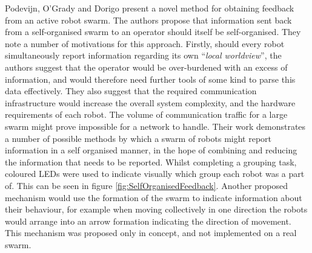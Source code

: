 Podevijn, O'Grady and Dorigo \cite{Podevijn:2012} present a novel method for obtaining feedback from an active robot swarm. The authors propose that information sent back from a self-organised swarm to an operator should itself be self-organised. They note a number of motivations for this approach. Firstly, should every robot simultaneously report information regarding its own ``\textit{local worldview}'', the authors suggest \cite{Podevijn:2012} that the operator would be over-burdened with an excess of information, and would therefore need further tools of some kind to parse this data effectively. They also suggest that the required communication infrastructure would increase the overall system complexity, and the hardware requirements of each robot. The volume of communication traffic for a large swarm might prove impossible for a network to handle. Their work \cite{Podevijn:2012} demonstrates a number of possible methods by which a swarm of robots might report information in a self organised manner, in the hope of combining and reducing the information that needs to be reported. Whilst completing a grouping task, coloured LEDs were used to indicate visually which group each robot was a part of. This can be seen in figure \ref{fig:SelfOrganisedFeedback}. Another proposed mechanism \cite{Podevijn:2012} would use the formation of the swarm to indicate information about their behaviour, for example when moving collectively in one direction the robots would arrange into an arrow formation indicating the direction of movement. This mechanism was proposed only in concept, and not implemented on a real swarm.


